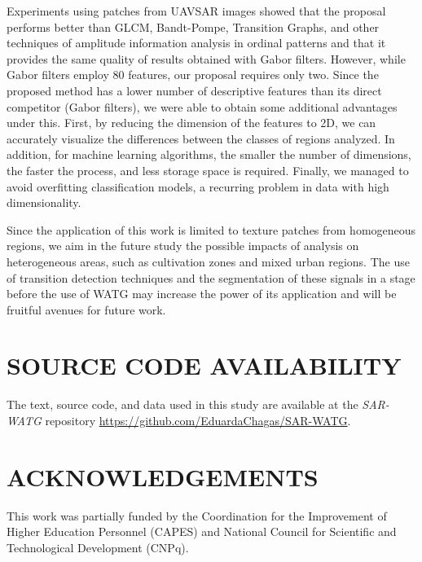 \documentclass[journal]{IEEEtran}
\begin{document}
	Experiments using patches from UAVSAR images showed that the proposal performs better than GLCM, Bandt-Pompe, Transition Graphs, and other techniques of amplitude information analysis in ordinal patterns and that it provides the same quality of results obtained with Gabor filters.
	However, while Gabor filters employ $80$ features, our proposal requires only two.
	Since the proposed method has a lower number of descriptive features than its direct competitor (Gabor filters), we were able to obtain some additional advantages under this.
	First, by reducing the dimension of the features to 2D, we can accurately visualize the differences between the classes of regions analyzed.
	In addition, for machine learning algorithms, the smaller the number of dimensions, the faster the process, and less storage space is required.
	Finally, we managed to avoid overfitting classification models, a recurring problem in data with high dimensionality.
	
	Since the application of this work is limited to texture patches from homogeneous regions, we aim in the future study the possible impacts of analysis on heterogeneous areas, such as cultivation zones and mixed urban regions.
	The use of transition detection techniques and the segmentation of these signals in a stage before the use of WATG may increase the power of its application and will be fruitful avenues for future work.
	
	
	\section{SOURCE CODE AVAILABILITY} 
	
	The text, source code, and data used in this study are available at the \textit{SAR-WATG} repository \url{https://github.com/EduardaChagas/SAR-WATG}.
	
	
	
	
	\section*{ACKNOWLEDGEMENTS}\label{ACKNOWLEDGEMENTS}
	
	This work was partially funded by the Coordination for the Improvement of Higher Education Personnel (CAPES) and National Council for Scientific and Technological Development (CNPq).
	
\end{document}
